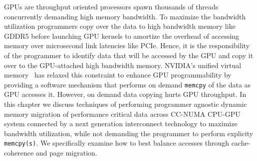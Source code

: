 GPUs are throughput oriented processors spawn thousands of threads concurrently
demanding high memory bandwidth. To maximize the bandwidth utilization
programmers copy over the data to high bandwidth memory like GDDR5 before
launching GPU kernels to amortize the overhead of accessing memory over
microsecond link latencies like PCIe. Hence, it is the responsibility of the
programmer to identify data that will be accessed by the GPU and copy it over to
the GPU-attached high bandwidth memory. NVIDIA's unified virtual
memory~\cite{UVM} has relaxed this constraint to enhance GPU programmability by
providing a software mechanism that performs on demand {\tt memcpy} of the data
as GPU accesses it. However, on demand data copying hurts GPU throughput. In
this chapter we discuss techniques of performing programmer agnostic dynamic
memory migration of performance critical data across CC-NUMA CPU-GPU system
connected by a next generation interconnect technology to maximize bandwidth
utilization, while not demanding the programmer to perform explicity {\tt
memcpy(s)}.  We specifically examine how to best balance accesses through
cache-coherence and page migration.



